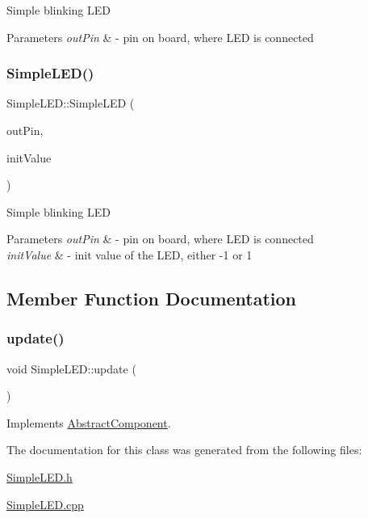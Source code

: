 Simple blinking L\+ED


\begin{DoxyParams}{Parameters}
{\em out\+Pin} & -\/ pin on board, where L\+ED is connected \\
\hline
\end{DoxyParams}
\mbox{\label{class_simple_l_e_d_a035610e281499c6a1160b2ae6b2797f0}} 
\subsubsection{\texorpdfstring{Simple\+L\+E\+D()}{SimpleLED()}\hspace{0.1cm}{\footnotesize\ttfamily [2/2]}}
{\footnotesize\ttfamily Simple\+L\+E\+D\+::\+Simple\+L\+ED (\begin{DoxyParamCaption}\item[{Pin\+Name}]{out\+Pin,  }\item[{int}]{init\+Value }\end{DoxyParamCaption})}

Simple blinking L\+ED


\begin{DoxyParams}{Parameters}
{\em out\+Pin} & -\/ pin on board, where L\+ED is connected \\
\hline
{\em init\+Value} & -\/ init value of the L\+ED, either -\/1 or 1 \\
\hline
\end{DoxyParams}


\subsection{Member Function Documentation}
\mbox{\label{class_simple_l_e_d_a1642dc4aca42ad46e5663a39cdda005f}} 
\subsubsection{\texorpdfstring{update()}{update()}}
{\footnotesize\ttfamily void Simple\+L\+E\+D\+::update (\begin{DoxyParamCaption}{ }\end{DoxyParamCaption})\hspace{0.3cm}{\ttfamily [virtual]}}



Implements \hyperlink{class_abstract_component_af25a90b8ab213762221c3b358d9873f3}{Abstract\+Component}.



The documentation for this class was generated from the following files\+:\begin{DoxyCompactItemize}
\item 
\hyperlink{_simple_l_e_d_8h}{Simple\+L\+E\+D.\+h}\item 
\hyperlink{_simple_l_e_d_8cpp}{Simple\+L\+E\+D.\+cpp}\end{DoxyCompactItemize}
